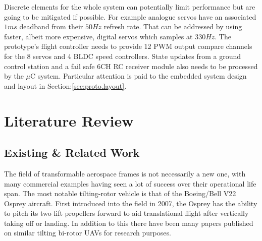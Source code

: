 Discrete elements for the whole system can potentially limit performance but are going to be mitigated if possible. For example analogue servos have an associated $1 ms$ deadband from their $50 Hz$ refresh rate. That can be addressed by using faster, albeit more expensive, digital servos which samples at $330 Hz$. The prototype's flight controller needs to provide 12 PWM output compare channels for the 8 servos and 4 BLDC speed controllers. State updates from a ground control station and a fail safe 6CH RC receiver module also needs to be processed by the $\mu$C system. Particular attention is paid to the embedded system design and layout in Section:\ref{sec:proto.layout}.%
\section{Literature Review}
\label{sec:intro.litreview}
\subsection{Existing \& Related Work}
\label{subsec:intro.lit.related}
The field of transformable aerospace frames is not necessarily a new one, with many commercial examples having seen a lot of success over their operational life span. The most notable tilting-rotor vehicle is that of the Boeing/Bell V22 Osprey\cite{osprey} aircraft. First introduced into the field in 2007, the Osprey has the ability to pitch its two lift propellers forward to aid translational flight after vertically taking off or landing. In addition to this there have been many papers published on similar tilting bi-rotor UAVs for research purposes.
